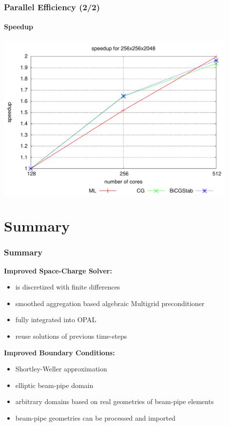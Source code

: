 \documentclass[xcolor=pdftex,table,10pt]{beamer}
\newcommand{\opal}{\textsc{OPAL }}
\begin{document}
	\begin{frame}
		\frametitle{Parallel Efficiency (2/2)}
		\framesubtitle{Speedup}
		
		\begin{center}
		\includegraphics[width=0.9\textwidth]{plots/speedup_SW.pdf}
		\end{center}

	\end{frame}


     \section{Summary}

     	\begin{frame}
		\frametitle{Summary}

		\textbf{Improved Space-Charge Solver:} \\

		\begin{itemize}
			\item is discretized with finite differences
			\item smoothed aggregation based algebraic Multigrid preconditioner
			\item fully integrated into \opal 
			\item reuse solutions of previous time-steps
		\end{itemize}
		\pause

		\vspace{0.4cm}

		\textbf{Improved Boundary Conditions:} \\

		\begin{itemize}
			\item Shortley-Weller approximation
			\item elliptic beam-pipe domain
			\item arbitrary domains based on real geometries of beam-pipe elements
			\item beam-pipe geometries can be processed and imported
		\end{itemize}

	\end{frame}
\end{document}
